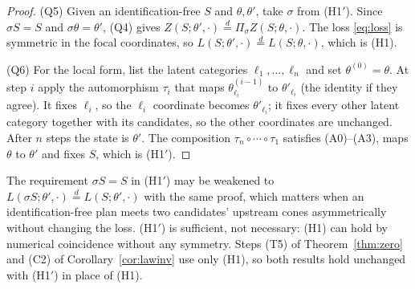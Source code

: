 \documentclass[pdflatex,sn-mathphys-num]{sn-jnl}
\theoremstyle{thmstyleone}
\theoremstyle{thmstyletwo}
\theoremstyle{thmstylethree}
\begin{document}
\begin{appendices}
\begin{proof}
\noindent(Q5) Given an identification-free $S$ and $\theta,\theta'$, take
$\sigma$ from (H1$'$). Since $\sigma S=S$ and $\sigma\theta=\theta'$, (Q4)
gives $Z(S;\theta',\cdot)\overset{d}{=}\Pi_\sigma Z(S;\theta,\cdot)$. The
loss \eqref{eq:loss} is symmetric in the focal coordinates, so
$L(S;\theta',\cdot)\overset{d}{=}L(S;\theta,\cdot)$, which is (H1).

\noindent(Q6) For the local form, list the latent categories
$\ell_1,\dots,\ell_n$ and set $\theta^{(0)}=\theta$. At step $i$ apply the
automorphism $\tau_i$ that maps $\theta^{(i-1)}_{\ell_i}$ to
$\theta'_{\ell_i}$ (the identity if they agree). It fixes $\ell_i$, so the
$\ell_i$ coordinate becomes $\theta'_{\ell_i}$; it fixes every other latent
category together with its candidates, so the other coordinates are
unchanged. After $n$ steps the state is $\theta'$. The composition
$\tau_n\circ\cdots\circ\tau_1$ satisfies (A0)--(A3), maps $\theta$ to
$\theta'$ and fixes $S$, which is (H1$'$).
\end{proof}

The requirement $\sigma S=S$ in (H1$'$) may be weakened to
$L(\sigma S;\theta',\cdot)\overset{d}{=}L(S;\theta',\cdot)$ with the same
proof, which matters when an identification-free plan meets two candidates'
upstream cones asymmetrically without changing the loss. (H1$'$) is
sufficient, not necessary: (H1) can hold by numerical coincidence without any
symmetry. Steps (T5) of Theorem~\ref{thm:zero} and (C2) of
Corollary~\ref{cor:lawinv} use only (H1), so both results hold unchanged with
(H1$'$) in place of (H1).

\end{appendices}
\end{document}
